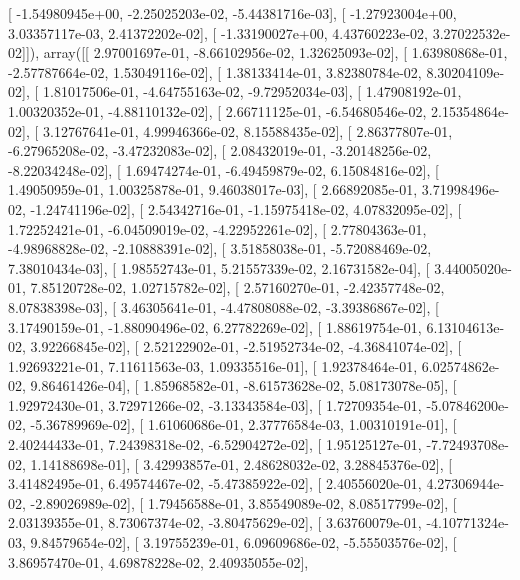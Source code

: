 \documentclass{article}
\begin{document}
       [ -1.54980945e+00,  -2.25025203e-02,  -5.44381716e-03],
       [ -1.27923004e+00,   3.03357117e-03,   2.41372202e-02],
       [ -1.33190027e+00,   4.43760223e-02,   3.27022532e-02]]), array([[  2.97001697e-01,  -8.66102956e-02,   1.32625093e-02],
       [  1.63980868e-01,  -2.57787664e-02,   1.53049116e-02],
       [  1.38133414e-01,   3.82380784e-02,   8.30204109e-02],
       [  1.81017506e-01,  -4.64755163e-02,  -9.72952034e-03],
       [  1.47908192e-01,   1.00320352e-01,  -4.88110132e-02],
       [  2.66711125e-01,  -6.54680546e-02,   2.15354864e-02],
       [  3.12767641e-01,   4.99946366e-02,   8.15588435e-02],
       [  2.86377807e-01,  -6.27965208e-02,  -3.47232083e-02],
       [  2.08432019e-01,  -3.20148256e-02,  -8.22034248e-02],
       [  1.69474274e-01,  -6.49459879e-02,   6.15084816e-02],
       [  1.49050959e-01,   1.00325878e-01,   9.46038017e-03],
       [  2.66892085e-01,   3.71998496e-02,  -1.24741196e-02],
       [  2.54342716e-01,  -1.15975418e-02,   4.07832095e-02],
       [  1.72252421e-01,  -6.04509019e-02,  -4.22952261e-02],
       [  2.77804363e-01,  -4.98968828e-02,  -2.10888391e-02],
       [  3.51858038e-01,  -5.72088469e-02,   7.38010434e-03],
       [  1.98552743e-01,   5.21557339e-02,   2.16731582e-04],
       [  3.44005020e-01,   7.85120728e-02,   1.02715782e-02],
       [  2.57160270e-01,  -2.42357748e-02,   8.07838398e-03],
       [  3.46305641e-01,  -4.47808088e-02,  -3.39386867e-02],
       [  3.17490159e-01,  -1.88090496e-02,   6.27782269e-02],
       [  1.88619754e-01,   6.13104613e-02,   3.92266845e-02],
       [  2.52122902e-01,  -2.51952734e-02,  -4.36841074e-02],
       [  1.92693221e-01,   7.11611563e-03,   1.09335516e-01],
       [  1.92378464e-01,   6.02574862e-02,   9.86461426e-04],
       [  1.85968582e-01,  -8.61573628e-02,   5.08173078e-05],
       [  1.92972430e-01,   3.72971266e-02,  -3.13343584e-03],
       [  1.72709354e-01,  -5.07846200e-02,  -5.36789969e-02],
       [  1.61060686e-01,   2.37776584e-03,   1.00310191e-01],
       [  2.40244433e-01,   7.24398318e-02,  -6.52904272e-02],
       [  1.95125127e-01,  -7.72493708e-02,   1.14188698e-01],
       [  3.42993857e-01,   2.48628032e-02,   3.28845376e-02],
       [  3.41482495e-01,   6.49574467e-02,  -5.47385922e-02],
       [  2.40556020e-01,   4.27306944e-02,  -2.89026989e-02],
       [  1.79456588e-01,   3.85549089e-02,   8.08517799e-02],
       [  2.03139355e-01,   8.73067374e-02,  -3.80475629e-02],
       [  3.63760079e-01,  -4.10771324e-03,   9.84579654e-02],
       [  3.19755239e-01,   6.09609686e-02,  -5.55503576e-02],
       [  3.86957470e-01,   4.69878228e-02,   2.40935055e-02],
\end{document}
